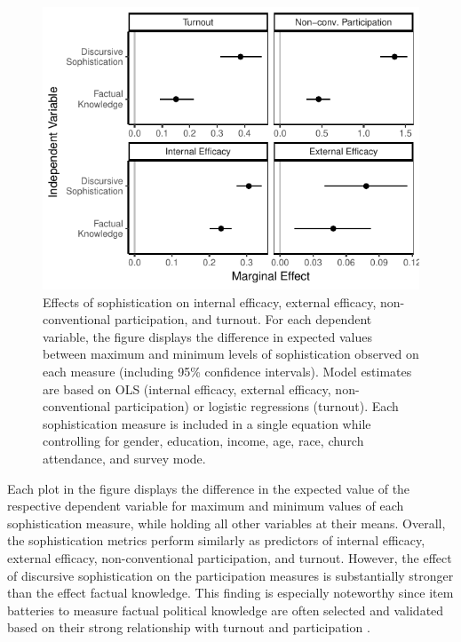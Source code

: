 \documentclass[12pt]{article}
\begin{document}
\begin{figure}[h]\centering
\includegraphics{../fig/knoweff_pres.pdf}
\caption{Effects of sophistication on internal efficacy, external efficacy, non-conventional participation, and turnout. For each dependent variable, the figure displays the difference in expected values between maximum and minimum levels of sophistication observed on each measure (including 95\% confidence intervals). Model estimates are based on OLS (internal efficacy, external efficacy, non-conventional participation) or logistic regressions (turnout). Each sophistication measure is included in a single equation while controlling for gender, education, income, age, race, church attendance, and survey mode.
}\label{fig:knoweff}
\end{figure}

Each plot in the figure displays the difference in the expected value of the respective dependent variable for maximum and minimum values of each sophistication measure, while holding all other variables at their means. Overall, the sophistication metrics perform similarly as predictors of internal efficacy, external efficacy, non-conventional participation, and turnout. However, the effect of discursive sophistication on the participation measures is substantially stronger than the effect factual knowledge. This finding is especially noteworthy since item batteries to measure factual political knowledge are often selected and validated based on their strong relationship with turnout and participation \citep[c.f.,][]{lupia2015uninformed}. 
\end{document}
